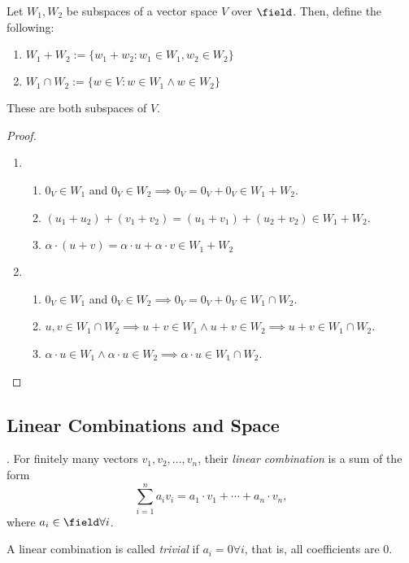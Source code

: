 \begin{proposition}
    Let $W_1, W_2$ be subspaces of a vector space $V$ over $\field$. Then, define the following:
    \begin{enumerate}
        \item $W_1 + W_2 := \{w_1 + w_2 : w_1 \in W_1, w_2 \in W_2\}$
        \item $W_1 \cap W_2:= \{w \in V : w \in W_1 \wedge w \in W_2\}$
    \end{enumerate}
    These are both subspaces of $V$.
\end{proposition}

\begin{proof}
    \begin{enumerate}
        \item \begin{enumerate}
            \item $0_V \in W_1$ and $0_V \in W_2 \implies 0_V = 0_V + 0_V \in W_1 + W_2$.
            \item $(u_1 +u_2) + (v_1 + v_2) = (u_1 + v_1) + (u_2 + v_2) \in W_1 + W_2$.
            \item $\alpha \cdot (u + v) = \alpha \cdot u + \alpha \cdot v \in W_1 + W_2$
        \end{enumerate}
        \item \begin{enumerate}
            \item $0_V \in W_1$ and $0_V \in W_2 \implies 0_V = 0_V + 0_V \in W_1 \cap W_2$.
            \item $u, v \in W_1 \cap W_2 \implies u + v \in W_1 \wedge u+v \in W_2 \implies u + v \in W_1 \cap W_2$.
            \item $\alpha \cdot u \in W_1 \wedge \alpha \cdot u \in W_2 \implies \alpha \cdot u \in W_1 \cap W_2$.
        \end{enumerate}
    \end{enumerate}
\end{proof}

\subsection{Linear Combinations and Space}

\begin{definition}
     . For finitely many vectors $v_1, v_2, \dots, v_n$, their \emph{linear combination} is a sum of the form \[
    \sum_{i=1}^{n} a_i v_i =  a_1 \cdot v_1 + \cdots + a_n \cdot v_n,
    \]
    where $a_i \in \field \forall i$.

    A linear combination is called \emph{trivial} if $a_i = 0 \forall i$, that is, all coefficients are $0$.
\end{definition}